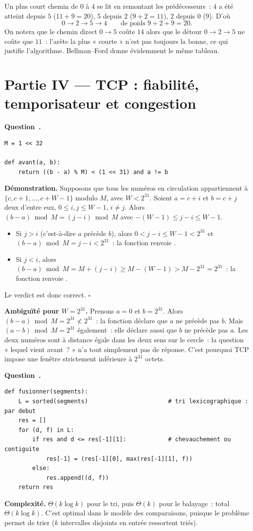 \documentclass[11pt,a4paper]{article}
\renewcommand{\Q}{\medskip\par\stepcounter{qcnt}\noindent\textbf{\color{cnc}Question~\theqcnt.}~}
\begin{document}
Un plus court chemin de $0$ à $4$ se lit en remontant les prédécesseurs~: $4$ a été atteint
depuis $5$ ($11+9=20$), $5$ depuis $2$ ($9+2=11$), $2$ depuis $0$ ($9$). D'où
\[ \boxed{0 \to 2 \to 5 \to 4}\qquad\text{de poids } 9+2+9=20. \]
On notera que le chemin direct $0\to 5$ coûte $14$ alors que le détour $0\to2\to5$ ne coûte
que $11$~: l'arête la plus « courte » n'est pas toujours la bonne, ce qui justifie
l'algorithme. Bellman--Ford donne évidemment le même tableau.

\section*{Partie IV --- TCP : fiabilité, temporisateur et congestion}

\Q
\begin{lstlisting}
M = 1 << 32

def avant(a, b):
    return ((b - a) % M) < (1 << 31) and a != b
\end{lstlisting}
\textbf{Démonstration.} Supposons que tous les numéros en circulation appartiennent à
$\{c,c+1,\dots,c+W-1\}$ modulo $M$, avec $W<2^{31}$. Soient $a=c+i$ et $b=c+j$ deux d'entre
eux, $0\le i,j\le W-1$, $i\ne j$. Alors $(b-a)\bmod M = (j-i)\bmod M$ avec
$-(W-1)\le j-i\le W-1$.
\begin{itemize}[leftmargin=1.4em,itemsep=1pt]
\item Si $j>i$ (c'est-à-dire $a$ précède $b$), alors $0<j-i\le W-1<2^{31}$ et
$(b-a)\bmod M=j-i<2^{31}$~: la fonction renvoie .
\item Si $j<i$, alors $(b-a)\bmod M=M+(j-i)\ge M-(W-1)>M-2^{31}=2^{31}$~: la fonction
renvoie .
\end{itemize}
Le verdict est donc correct. \hfill$\square$

\textbf{Ambiguïté pour $W=2^{31}$.} Prenons $a=0$ et $b=2^{31}$. Alors
$(b-a)\bmod M=2^{31}\not<2^{31}$~: la fonction déclare que $a$ ne précède pas $b$. Mais
$(a-b)\bmod M=2^{31}$ également~: elle déclare aussi que $b$ ne précède pas $a$. Les deux
numéros sont à distance égale dans les deux sens sur le cercle~: la question « lequel vient
avant~? » n'a tout simplement pas de réponse. C'est pourquoi TCP impose une fenêtre
strictement inférieure à $2^{31}$ octets.

\Q
\begin{lstlisting}
def fusionner(segments):
    L = sorted(segments)                       # tri lexicographique : par debut
    res = []
    for (d, f) in L:
        if res and d <= res[-1][1]:            # chevauchement ou contiguite
            res[-1] = (res[-1][0], max(res[-1][1], f))
        else:
            res.append((d, f))
    return res
\end{lstlisting}
\textbf{Complexité.} $\Theta(k\log k)$ pour le tri, puis $\Theta(k)$ pour le balayage~: total
$\Theta(k\log k)$. C'est optimal dans le modèle des comparaisons, puisque le problème permet
de trier ($k$ intervalles disjoints en entrée ressortent triés).
\end{document}
